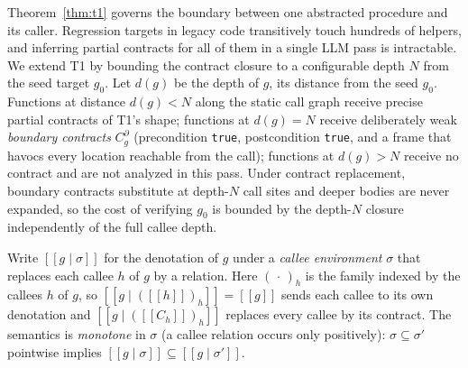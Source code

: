 \documentclass[conference]{IEEEtran}
\theoremstyle{definition}
\theoremstyle{remark}
\newcommand{\sem}[1]{[\![#1]\!]}
\begin{document}
Theorem~\ref{thm:t1} governs the boundary between one abstracted procedure and
its caller.
Regression targets in legacy code transitively touch
hundreds of helpers, and inferring partial contracts for all of them
in a single LLM pass is intractable. We extend T1 by bounding the
contract closure to a configurable depth $N$ from the seed target
$g_0$. Let $d(g)$ be the depth of $g$, its distance from the seed $g_0$.
Functions at distance $d(g) < N$ along the static call graph
receive precise partial contracts of T1's shape; functions at $d(g) =
N$ receive deliberately weak \emph{boundary contracts}
$C^{\partial}_g$ (precondition \texttt{true}, postcondition \texttt{true},
and a frame that havocs every location reachable from the call);
functions at $d(g) > N$
receive no contract and are not analyzed in this pass. Under
contract replacement, boundary contracts
substitute at depth-$N$ call sites and deeper bodies are never
expanded, so the cost of verifying $g_0$ is bounded by the depth-$N$
closure independently of the full callee depth.

Write $\sem{g\mid\sigma}$ for the denotation of $g$ under a \emph{callee
environment} $\sigma$ that replaces each callee $h$ of $g$ by a relation.
Here $(\,\cdot\,)_h$ is the family indexed by the callees $h$ of $g$, so
$\sem{g\mid(\sem{h})_h}=\sem{g}$ sends each callee to its own denotation and
$\sem{g\mid(\sem{C_h})_h}$ replaces every callee by its contract. The
semantics is \emph{monotone} in $\sigma$ (a callee
relation occurs only positively): $\sigma\subseteq\sigma'$ pointwise implies
$\sem{g\mid\sigma}\subseteq\sem{g\mid\sigma'}$.
\end{document}
